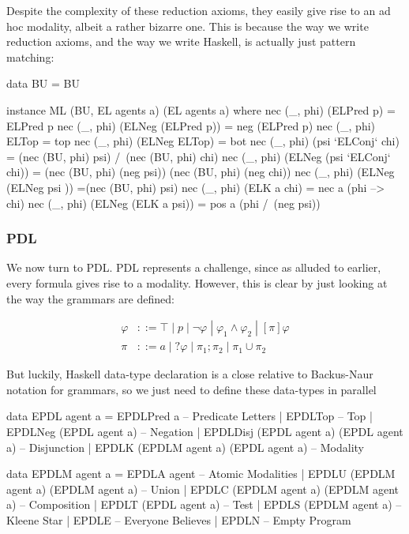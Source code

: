 \documentclass[11pt]{article}
\theoremstyle{definition}
\begin{document}
Despite the complexity of these reduction axioms, they easily give rise to an ad hoc modality, albeit a rather bizarre one. This is because the way we write reduction axioms, and the way we write Haskell, is actually just pattern matching:

\begin{code}
data BU = BU

instance ML (BU, EL agents a) (EL agents a) where
  nec (_, phi) (ELPred p) = ELPred p
  nec (_, phi) (ELNeg (ELPred p)) = neg (ELPred p)
  nec (_, phi) ELTop = top
  nec (_, phi) (ELNeg ELTop) = bot
  nec (_, phi) (psi `ELConj` chi) = 
      (nec (BU, phi) psi) /\ (nec (BU, phi) chi)
  nec (_, phi) (ELNeg (psi `ELConj` chi)) = 
      (nec (BU, phi) (neg psi)) \/ (nec (BU, phi) (neg chi))
  nec (_, phi) (ELNeg (ELNeg psi )) =(nec (BU, phi) psi)
  nec (_, phi) (ELK a chi) = nec a (phi --> chi) 
  nec (_, phi) (ELNeg (ELK a psi)) = pos a (phi /\ (neg psi))
\end{code}

\subsubsection{PDL}\label{pdlinstance}

We now turn to PDL.  PDL represents a challenge, since as alluded to earlier, every formula gives rise to a modality.  However, this is clear by just looking at the way the grammars are defined:

\begin{align*}
\varphi & ::= \top \; | \; p \; | \; \neg \varphi \; | \; \varphi_1 \wedge \varphi_2 \; | \; [\pi] \varphi\\
\pi & ::= a \; | \; ? \varphi \; | \; \pi_1 ; \pi_2 \; | \; \pi_1 \cup \pi_2
\end{align*}

But luckily, Haskell data-type declaration is a close relative to Backus-Naur notation for grammars, so we just need to define these data-types in parallel

\begin{code}
data EPDL agent a =
     EPDLPred a                               -- Predicate Letters
   | EPDLTop                                  -- Top
   | EPDLNeg (EPDL agent a)                   -- Negation
   | EPDLDisj (EPDL agent a) (EPDL agent a)   -- Disjunction
   | EPDLK (EPDLM agent a) (EPDL agent a)     -- Modality

data EPDLM agent a =
     EPDLA agent                              -- Atomic Modalities
   | EPDLU (EPDLM agent a) (EPDLM agent a)    -- Union
   | EPDLC (EPDLM agent a) (EPDLM agent a)    -- Composition
   | EPDLT (EPDL agent a)                     -- Test
   | EPDLS (EPDLM agent a)                    -- Kleene Star
   | EPDLE                                    -- Everyone Believes
   | EPDLN                                    -- Empty Program
\end{code}
\end{document}
